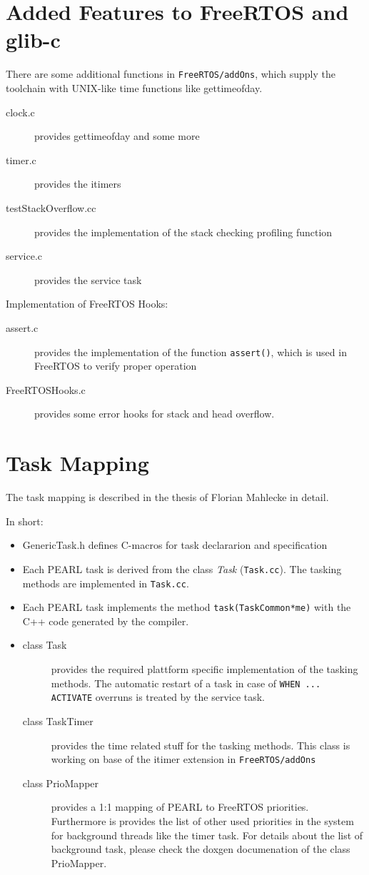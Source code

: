 \section{Added Features to FreeRTOS and glib-c}
There are some additional functions in \texttt{FreeRTOS/addOns},
 which supply the toolchain
with UNIX-like time functions like gettimeofday.
\begin{description}
\item[clock.c]provides gettimeofday and some more
\item[timer.c] provides the itimers
\item[testStackOverflow.cc] provides the implementation of the 
  stack checking profiling function
\item[service.c] provides the service task
\end{description}

Implementation of FreeRTOS Hooks:
\begin{description}
\item[assert.c] provides the implementation of the function
  \texttt{assert()}, which is used in FreeRTOS to verify
  proper operation
\item[FreeRTOSHooks.c] provides some error hooks for stack and head overflow.
\end{description}

\section{Task Mapping}

The task mapping is described in the thesis of
 Florian Mahlecke in detail.

In short:
\begin{itemize}
\item GenericTask.h defines C-macros for task declararion and specification
\item Each PEARL task is derived from the class {\em Task} (\verb|Task.cc|).
      The tasking methods are implemented in \verb|Task.cc|.
\item Each PEARL task implements the method \verb|task(TaskCommon*me)| 
    with the C++ code generated by the compiler.
\item {
  \begin{description}
  \item[class Task] provides the required plattform specific implementation
     of the tasking methods. The automatic restart of a task in case of
     \verb|WHEN ... ACTIVATE| overruns is treated by the service task.
  \item[class TaskTimer] provides the time related stuff for the tasking
     methods. This class is working on base of the itimer extension 
     in \texttt{FreeRTOS/addOns}
  \item[class PrioMapper] provides a 1:1 mapping of PEARL to FreeRTOS
      priorities. Furthermore is provides the list of other used
      priorities in the system for background threads like the timer task.
      For details about the list of background task, please 
      check the doxgen documenation of the class PrioMapper.
  \end{description}
}
\end{itemize}

